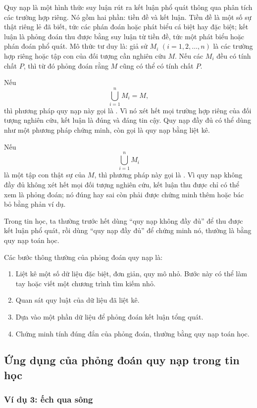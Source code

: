 \documentclass[11pt]{article}
\begin{document}
Quy nạp là một hình thức suy luận rút ra kết luận phổ quát thông qua phân
tích các trường hợp riêng. Nó gồm hai phần: tiền đề và kết luận. Tiền đề là
một số sự thật riêng lẻ đã biết, tức các phán đoán hoặc phát biểu cá biệt hay
đặc biệt; kết luận là phỏng đoán thu được bằng suy luận từ tiền đề, tức một
phát biểu hoặc phán đoán phổ quát. Mô thức tư duy là: giả sử \(M_i\)
\((i=1,2,\ldots,n)\) là các trường hợp riêng hoặc tập con của đối tượng cần
nghiên cứu \(M\). Nếu các \(M_i\) đều có tính chất \(P\), thì từ đó phỏng
đoán rằng \(M\) cũng có thể có tính chất \(P\).

Nếu
\[
  \bigcup_{i=1}^{n} M_i=M,
\]
thì phương pháp quy nạp này gọi là . Vì nó xét hết mọi
trường hợp riêng của đối tượng nghiên cứu, kết luận là đúng và đáng tin cậy.
Quy nạp đầy đủ có thể dùng như một phương pháp chứng minh, còn gọi là quy nạp
bằng liệt kê.

Nếu
\[
  \bigcup_{i=1}^{n} M_i
\]
là một tập con thật sự của \(M\), thì phương pháp này gọi là . Vì quy nạp không đầy đủ không xét hết mọi đối tượng nghiên
cứu, kết luận thu được chỉ có thể xem là phỏng đoán; nó đúng hay sai còn phải
được chứng minh thêm hoặc bác bỏ bằng phản ví dụ.

Trong tin học, ta thường trước hết dùng ``quy nạp không đầy đủ'' để thu được
kết luận phổ quát, rồi dùng ``quy nạp đầy đủ'' để chứng minh nó, thường là
bằng quy nạp toán học.

Các bước thông thường của phỏng đoán quy nạp là:
\begin{enumerate}
  \item {} Liệt kê một số dữ liệu đặc biệt, đơn giản, quy mô
  nhỏ. Bước này có thể làm tay hoặc viết một chương trình tìm kiếm nhỏ.
  \item {} Quan sát quy luật của dữ liệu đã liệt kê.
  \item {} Dựa vào một phần dữ liệu để phỏng đoán kết luận
  tổng quát.
  \item {} Chứng minh tính đúng đắn của phỏng đoán, thường
  bằng quy nạp toán học.
\end{enumerate}

\subsection{Ứng dụng của phỏng đoán quy nạp trong tin học}

\subsubsection*{Ví dụ 3: ếch qua sông}
\end{document}
